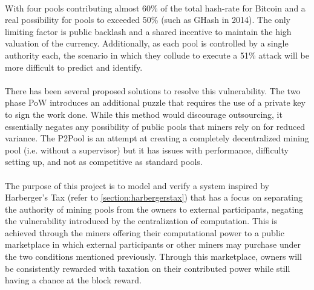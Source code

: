 \paragraph{} With four pools contributing almost 60\% of the total hash-rate for Bitcoin \cite{bitcoinpools2020} and a real possibility for pools to exceeded 50\% (such as GHash in 2014). The only limiting factor is public backlash and a shared incentive to maintain the high valuation of the currency. Additionally, as each pool is controlled by a single authority each, the scenario in which they collude to execute a 51\% attack will be more difficult to predict and identify.

\paragraph{} There has been several proposed solutions to resolve this vulnerability. The two phase PoW \cite{bastiaan2015} introduces an additional puzzle that requires the use of a private key to sign the work done. While this method would discourage outsourcing, it essentially negates any possibility of public pools that miners rely on for reduced variance. The P2Pool is an attempt at creating a completely decentralized mining pool (i.e. without a supervisor) but it has issues with performance, difficulty setting up, and not as competitive as standard pools.

\paragraph{} The purpose of this project is to model and verify a system inspired by Harberger's Tax (refer to \ref{section:harbergerstax}) that has a focus on separating the authority of mining pools from the owners to external participants, negating the vulnerability introduced by the centralization of computation. This is achieved through the miners offering their computational power to a public marketplace in which external participants or other miners may purchase under the two conditions mentioned previously. Through this marketplace, owners will be consistently rewarded with taxation on their contributed power while still having a chance at the block reward.



